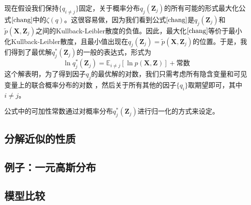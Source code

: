 现在假设我们保持$\{q_{i\ne j}\}$固定，关于概率分布$q_j(\boldsymbol{Z}_j)$的所有可能的形式最大化公式$\ref{chang}$中的$\zeta(q)$。这很容易做，因为我们看到公式$\ref{chang}$是$q_j(\boldsymbol{Z}_j)$和$\tilde{p}(\boldsymbol{X},\boldsymbol{Z}_j)$之间的Kullback-Leibler散度的负值。因此，最大化$\ref{chang}$等价于最小化Kullback-Leibler散度，且最小值出现在$q_j(\boldsymbol{Z}_j)=\tilde{p}(\boldsymbol{X},\boldsymbol{Z}_j)$的位置。于是，我们得到了最优解$q_j^*(\boldsymbol{Z}_j)$的一般的表达式，形式为
\begin{equation}
	\ln q_j^*(\boldsymbol{Z}_j)=\mathbb{E}_{i\ne j}[\ln p(\boldsymbol{X},\boldsymbol{Z})] +\text{常数}
\end{equation}
这个解表明，为了得到因子$q_j$的最优解的对数，我们只需考虑所有隐含变量和可见变量上的联合概率分布的对数 ，然后关于所有其他的因子$\{q_i\}$取期望即可，其中$i\ne j$。

公式中的可加性常数通过对概率分布$q_j^*(\boldsymbol{Z}_j)$进行归一化的方式来设定。
\subsection*{分解近似的性质}
\subsection*{例子：一元高斯分布}
\subsection*{模型比较}
